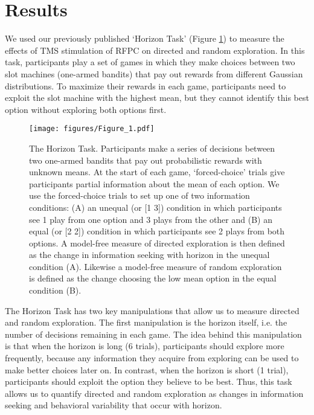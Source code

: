 \documentclass[12pt]{article}
\begin{document}
\section*{Results}
We used our previously published `Horizon Task' (Figure \ref{fig:task}) to measure the effects of TMS stimulation of RFPC on directed and random exploration.  In this task, participants play a set of games in which they make choices between two slot machines (one-armed bandits) that pay out rewards from different Gaussian distributions. To maximize their rewards in each game, participants need to exploit the slot machine with the highest mean, but they cannot identify this best option without exploring both options first. 

\begin{figure}[t]
\begin{center}
		\texttt{[image: figures/Figure\_1.pdf]}
\caption{The Horizon Task. Participants make a series of decisions between two one-armed bandits that pay out probabilistic rewards with unknown means. At the start of each game, `forced-choice' trials give participants partial information about the mean of each option.  We use the forced-choice trials to set up one of two information conditions: (A) an unequal (or [1 3]) condition in which participants see 1 play from one option and 3 plays from the other and (B) an equal (or [2 2]) condition in which participants see 2 plays from both options. A model-free measure of directed exploration is then defined as the change in information seeking with horizon in the unequal condition (A). Likewise a model-free measure of random exploration is defined as the change choosing the low mean option in the equal condition (B).}
\label{fig:task}
\end{center}
\end{figure}

 
The Horizon Task has two key manipulations that allow us to measure directed and random exploration.  The first manipulation is the horizon itself, i.e. the number of decisions remaining in each game.  The idea behind this manipulation is that when the horizon is long (6 trials), participants should explore more frequently, because any information they acquire from exploring can be used to make better choices later on. In contrast, when the horizon is short (1 trial), participants should exploit the option they believe to be best. Thus, this task allows us to quantify directed and random exploration as changes in information seeking and behavioral variability that occur with horizon.
\end{document}
